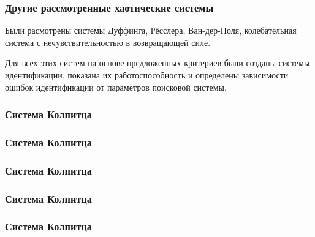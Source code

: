 \documentclass[10pt,utf8]{beamer}
\begin{document}

\begin{frame}
  \frametitle{Другие рассмотренные хаотические системы}

  Были расмотрены системы Дуффинга, Рёсслера, Ван-дер-Поля,
  колебательная система с нечувствительностью в возвращающей силе.

  Для всех этих систем на основе предложенных критериев были
  созданы системы идентификации, показана их работоспособность
  и определены зависимости ошибок идентификации от параметров поисковой системы.


\end{frame}





\begin{frame}
  \frametitle{Система Колпитца}


\end{frame}




\begin{frame}
  \frametitle{Система Колпитца}


\end{frame}




\begin{frame}
  \frametitle{Система Колпитца}


\end{frame}




\begin{frame}
  \frametitle{Система Колпитца}


\end{frame}




\begin{frame}
  \frametitle{Система Колпитца}


\end{frame}
\end{document}
